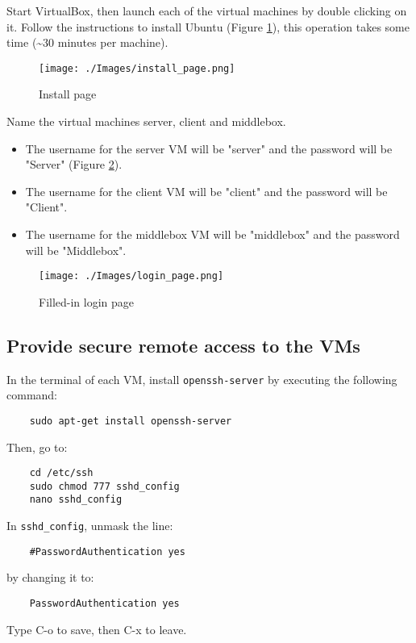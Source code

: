 \documentclass[11pt]{article}
\begin{document}
Start VirtualBox, then launch each of the virtual machines by double clicking on it. Follow the instructions to install Ubuntu (Figure \ref{fig:UbuntuInstall}), this operation takes some time (\textasciitilde{}30 minutes per machine). 

\begin{figure}[H]
  \centering
  \texttt{[image: ./Images/install\_page.png]}
  \caption{Install page}
  \label{fig:UbuntuInstall}
\end{figure} 


Name the virtual machines server, client and middlebox. 
\begin{itemize}
    \item The username for the server VM will be "server" and the password will be "Server" (Figure \ref{fig:LoginPage}).
    \item The username for the client VM will be "client" and the password will be "Client".
    \item The username for the middlebox VM will be "middlebox" and the password will be "Middlebox".
\end{itemize}

\begin{figure}[H]
    \centering
    \texttt{[image: ./Images/login\_page.png]}
    \caption{Filled-in login page}
    \label{fig:LoginPage}
\end{figure}



\subsection{Provide secure remote access to the VMs}
\label{sec:org1e09e96}

In the terminal of each VM, install \texttt{openssh-server} by executing the following command:
\begin{verbatim}
    sudo apt-get install openssh-server
\end{verbatim}

Then, go to:
\begin{verbatim}
    cd /etc/ssh
    sudo chmod 777 sshd_config
    nano sshd_config
\end{verbatim}

In \texttt{sshd\_config}, unmask the line: 
\begin{verbatim}
    #PasswordAuthentication yes
\end{verbatim}
by changing it to:
\begin{verbatim}
    PasswordAuthentication yes
\end{verbatim}
Type C-o to save, then C-x to leave. \newline
\end{document}
